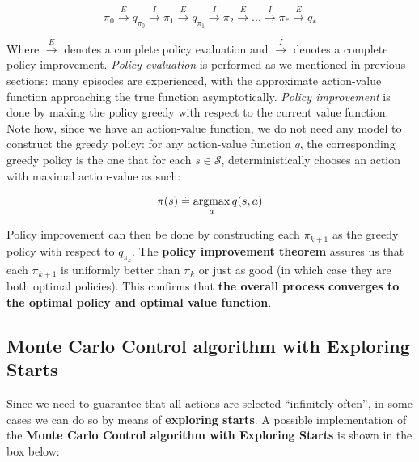 \begin{equation}
    \pi_0 \overset{E}{\rightarrow} q_{\pi_0} \overset{I}{\rightarrow} \pi_1 \overset{E}{\rightarrow} q_{\pi_1} \overset{I}{\rightarrow} \pi_2 \overset{E}{\rightarrow} ... \overset{I}{\rightarrow} \pi_* \overset{E}{\rightarrow} q_*
    \label{eq:ch3-generalizedpolicyiteration}
\end{equation}

Where $\overset{E}{\rightarrow}$ denotes a complete policy evaluation and $\overset{I}{\rightarrow}$ denotes a complete policy improvement. \textit{Policy evaluation} is performed as we mentioned in previous sections: many episodes are experienced, with the approximate action-value function approaching the true function asymptotically. \textit{Policy improvement} is done by making the policy greedy with respect to the current value function. Note how, since we have an action-value function, we do not need any model to construct the greedy policy: for any action-value function $q$, the corresponding greedy policy is the one that for each $s \in \mathcal{S}$, deterministically chooses an action with maximal action-value as such:

\begin{equation*}
    \pi(s) \doteq \operatorname*{argmax}_a q(s,a)
\end{equation*}

Policy improvement can then be done by constructing each $\pi_{k+1}$ as the greedy policy with respect to $q_{\pi_k}$. The \textbf{policy improvement theorem} assures us that each $\pi_{k+1}$ is uniformly better than $\pi_k$ or just as good (in which case they are both optimal policies). This confirms that \textbf{the overall process converges to the optimal policy and optimal value function}.

\subsection{Monte Carlo Control algorithm with Exploring Starts}
Since we need to guarantee that all actions are selected ``infinitely often'', in some cases we can do so by means of \textbf{exploring starts}. A possible implementation of the \textbf{Monte Carlo Control algorithm with Exploring Starts} is shown in the box below:

